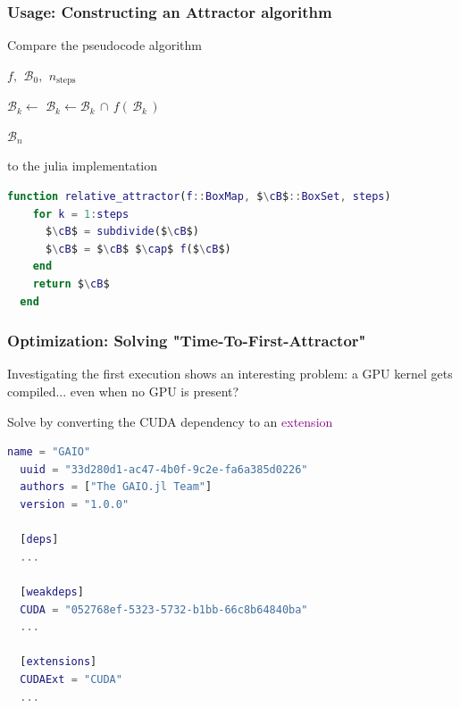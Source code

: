 \documentclass[
  english,            %
  aspectratio=169,    %
]{tumbeamer}
\newcommand{\cB}{\mathcal{B}}
\renewcommand{\emph}[1]{\textcolor{purple}{#1}}
\begin{document}
\begin{frame}[fragile]
\frametitle{Usage: Constructing an Attractor algorithm}


Compare the pseudocode algorithm

\begin{algorithmic}[1]
    \Require $f,\,\ \cB_0,\,\ n_{\text{steps}}$

        \State $\mathcal{B}_k \gets$ 
        \State $\mathcal{B}_k \gets \mathcal{B}_k\, \cap\, f (\,\mathcal{B}_k\,)$
    \EndFor

    \State \Return $\mathcal{B}_n$ 
\end{algorithmic}

to the julia implementation

\begin{lstlisting}[language=Matlab,mathescape]
  function relative_attractor(f::BoxMap, $\cB$::BoxSet, steps)
    for k = 1:steps
      $\cB$ = subdivide($\cB$)
      $\cB$ = $\cB$ $\cap$ f($\cB$)
    end
    return $\cB$
  end
\end{lstlisting}

\end{frame}

\begin{frame}[fragile]
\frametitle{Optimization: Solving "Time-To-First-Attractor"}
  
Investigating the first execution shows an interesting problem: a GPU kernel gets compiled... even when no GPU is present?

Solve by converting the CUDA dependency to an \emph{extension}

\begin{lstlisting}[language=Matlab,mathescape]
  name = "GAIO"
  uuid = "33d280d1-ac47-4b0f-9c2e-fa6a385d0226"
  authors = ["The GAIO.jl Team"]
  version = "1.0.0"

  [deps]
  ...

  [weakdeps]
  CUDA = "052768ef-5323-5732-b1bb-66c8b64840ba"
  ...

  [extensions]
  CUDAExt = "CUDA"
  ...
\end{lstlisting}

\end{frame}
\end{document}
